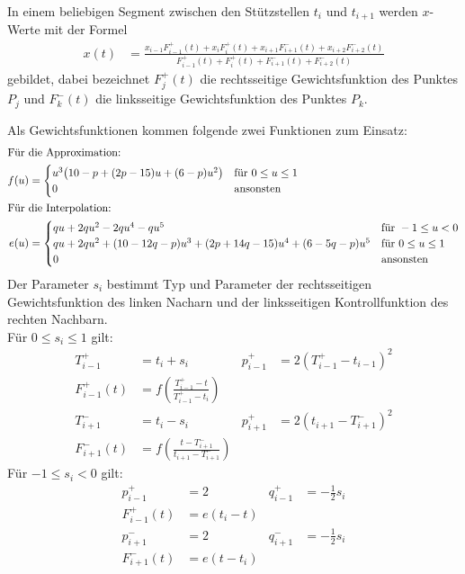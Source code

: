 \documentclass[ngerman,origlongtable]{scrartcl}
\begin{document}
In einem beliebigen Segment zwischen den Stützstellen \(t_i\) und \(t_{i+1}\)
werden \(x\)-Werte mit der Formel
\begin{align*}x(t)&=\frac{x_{i-1}F_{i-1}^+(t)+x_iF_i^+(t)+x_{i+1}F_{i+1}^-(t)+x_{i+2}F_{i+2}^-(t)}{ F_{i-1}^+(t)+F_i^+(t)+F_{i+1}^-(t)+F_{i+2}^-(t)}\end{align*}
gebildet, dabei bezeichnet \(F_j^+(t)\) die rechtsseitige Gewichtsfunktion
des Punktes \(P_j\) und \(F_k^-(t)\) die linksseitige Gewichtsfunktion
des Punktes \(P_k\).

Als Gewichtsfunktionen kommen folgende zwei Funktionen zum Einsatz:
\begin{align*}
\intertext{Für die Approximation:}
f(u)&=\begin{cases}
u^3\big(10-p+(2p-15)u+(6-p)u^2\big)&\text{für~}0\leq{}u\leq{}1\\
0&\text{ansonsten}\\
\end{cases}\\
\intertext{Für die Interpolation:}
e(u)&=\begin{cases}
qu+2qu^2-2qu^4-qu^5&\text{für~}-1\leq{}u<0\\
qu+2qu^2+(10-12q-p)u^3+(2p+14q-15)u^4+(6-5q-p)u^5&\text{für~}0\leq{}u\leq{}1\\
0&\text{ansonsten}\\
\end{cases}
\end{align*}
\clearpage
Der Parameter \(s_i\) bestimmt Typ und Parameter der rechtsseitigen
Gewichtsfunktion des linken Nacharn und der linksseitigen Kontrollfunktion
des rechten Nachbarn.\\
Für \(0\leq{}s_i\leq{}1\) gilt:
\begin{align*}
T_{i-1}^+&=t_i+s_i&p_{i-1}^+&=2{(T_{i-1}^+-t_{i-1})}^2\\[0.2em]
F_{i-1}^+(t)&=f\left(\frac{T_{i-1}^+-t}{T_{i-1}^+-t_i}\right)\\[0.2em]
T_{i+1}^-&=t_i-s_i&p_{i+1}^+&=2{(t_{i+1}-T_{i+1}^-)}^2\\[0.2em]
F_{i+1}^-(t)&=f\left(\frac{t-T_{i+1}^-}{t_{i+1}-T_{i+1}^-}\right)
\end{align*}
Für \(-1\leq{}s_i<0\) gilt:
\begin{align*}
p_{i-1}^+&=2&q_{i-1}^+&=-\tfrac{1}{2}s_i\\[0.2em]
F_{i-1}^+(t)&=e(t_i-t)\\[0.2em]
p_{i+1}^-&=2&q_{i+1}^-&=-\tfrac{1}{2}s_i\\[0.2em]
F_{i+1}^-(t)&=e(t-t_i)
\end{align*}
\clearpage
\end{document}
